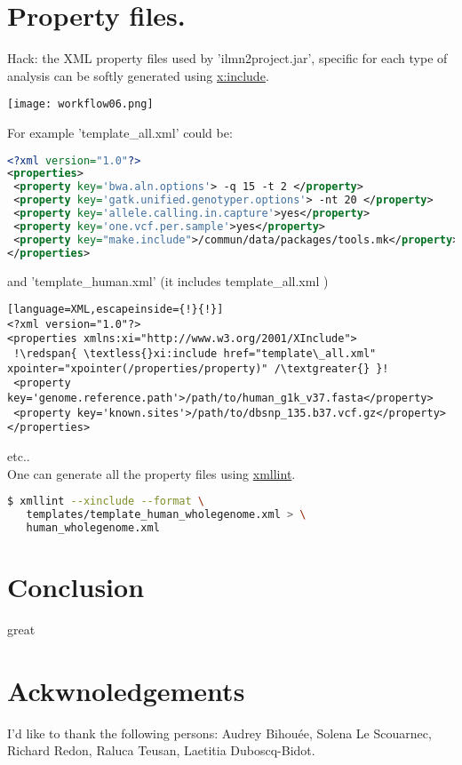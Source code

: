 \documentclass{article}
\newcommand{\redspan}[1]{\textcolor{red}{#1}}
\begin{document}
\section{Property files.}
Hack: the XML property files used by 'ilmn2project.jar', specific for each type of analysis can be softly generated using \href{http://www.w3.org/TR/xinclude/}{x:include}.
\begin{center}
\texttt{[image: workflow06.png]}
\end{center}
For example 'template\_all.xml' could be:
\begin{lstlisting}[language=XML]
<?xml version="1.0"?>
<properties>
 <property key='bwa.aln.options'> -q 15 -t 2 </property>
 <property key='gatk.unified.genotyper.options'> -nt 20 </property>
 <property key='allele.calling.in.capture'>yes</property>
 <property key='one.vcf.per.sample'>yes</property>
 <property key="make.include">/commun/data/packages/tools.mk</property>
</properties>
\end{lstlisting}
and 'template\_human.xml' (it includes template\_all.xml )
\begin{lstlisting}[language=XML,escapeinside={!}{!}]
<?xml version="1.0"?>
<properties xmlns:xi="http://www.w3.org/2001/XInclude">
 !\redspan{ \textless{}xi:include href="template\_all.xml" xpointer="xpointer(/properties/property)" /\textgreater{} }!
 <property key='genome.reference.path'>/path/to/human_g1k_v37.fasta</property>
 <property key='known.sites'>/path/to/dbsnp_135.b37.vcf.gz</property>
</properties>
\end{lstlisting}
etc..\\
One can generate all the property files using \href{http://xmlsoft.org/xmllint.html}{xmllint}.
\begin{lstlisting}[language=bash]
$ xmllint --xinclude --format \
   templates/template_human_wholegenome.xml > \
   human_wholegenome.xml
\end{lstlisting} 
\section{Conclusion}
great
\section{Ackwnoledgements}
I'd like to thank the following persons:  Audrey Bihouée, Solena Le Scouarnec, Richard Redon, Raluca Teusan, Laetitia Duboscq-Bidot.
\end{document}
